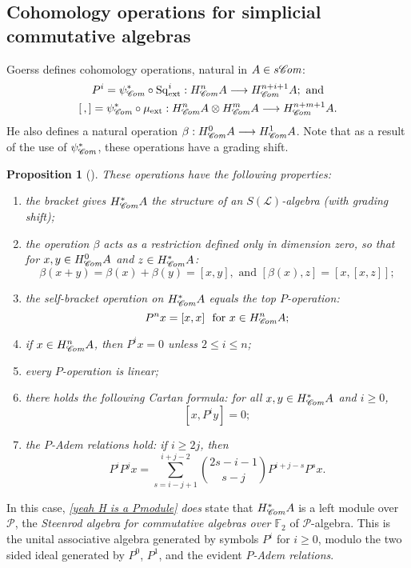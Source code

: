 \documentclass[11pt]{amsart} \renewcommand{\baselinestretch}{1.2}
\theoremstyle{plain}
\newtheorem{prop}[thm]{Proposition}
\numberwithin{equation}{section} %
\theoremstyle{plain}
\newtheorem{prop}[thm]{Proposition}
\numberwithin{equation}{chapter} %
\renewcommand{\to}{\longrightarrow}
\newcommand{\squishlist}{
}
\newcommand{\scrL}{\mathscr{L}}
\newcommand{\scrC}{\mathscr{C}}
\newcommand{\calP}{\mathcal{P}}
\newcommand{\citeBOX}[2][]{\cite[\mbox{#1}]{#2}}
\newcommand{\Palg}{{\calP}}
\newcommand{\LieOperad}{{\scrL}}
\newcommand{\ExtCohOp}{\mathrm{Sq}_\mathrm{ext}}
\newcommand{\ExtCohProd}{\mu_\mathrm{ext}}
\newcommand{\F}{\mathbb{F}}
\newcommand{\algs}{{\scrC\!\textit{\normalfont\textit{om}}}}
\newcommand{\Ftwo}{\F_2}
\newcommand{\SubsectionOrSection}[1]{\subsection{#1}}
\begin{document}
\begin{Constructing cohomology operations}
\SubsectionOrSection{Cohomology operations for simplicial commutative algebras}
\label{The example of simplicial commutative F2-algebras}
Goerss \citeBOX[\S5]{MR1089001} defines cohomology operations, natural in $A\in s \algs$:
\begin{gather*}
P^i=\psi^*_{\algs}\circ\ExtCohOp^i:H^n_{\algs}A\to H_{\algs}^{n+i+1}A;\textup{ and}\\
[\,,]=\psi^*_{\algs}\circ\ExtCohProd :H_{\algs}^nA\otimes H_{\algs}^mA\to H_{\algs}^{n+m+1}A.
\end{gather*}
He also defines a natural operation $\beta:H_{\algs}^0A\to H_{\algs}^1A$. Note that as a result of the use of $\psi^*_{\algs}$, these operations have a grading shift.
\begin{prop}[{\citeBOX[\S5]{MR1089001}}]
\label{omnibus on coh of simp algs}These operations have the following properties:
\begin{enumerate}\squishlist
\item the bracket gives $H^*_{\algs}A$ the structure of an $S(\LieOperad)$-algebra (with grading shift);
\item the operation $\beta$ acts as a restriction defined only in dimension zero, so that for $x,y\in H^0_{\algs}A$ and $z\in H^*_{\algs}A$:
\[\beta(x+y)=\beta(x)+\beta(y)=[x,y],\text{\ \ and \ }[\beta(x),z]=[x,[x,z]];\]
\item the self-bracket operation on $H^*_{\algs}A$ equals the \emph{top $P$-operation}:
\[P^nx=[x,x]\text{\ \ for $x\in H^n_{\algs}A$};\]
\item \label{P unstable vanishing} if $x\in H^n_{\algs}A$, then $P^ix=0$ unless $2\leq i\leq n$;
\item every $P$-operation is linear;
\item there holds the following \emph{Cartan formula}:  for all $x,y\in   H^*_{\algs}A$ and $i\geq0$,
\[[x,P^iy]=0;\]
\item \label{yeah H is a Pmodule}the \emph{$P$-Adem relations} hold: if $i\geq 2j$, then
\[P^iP^jx=\sum_{s=i-j+1}^{i+j-2}\binom{2s-i-1}{ s-j}P^{i+j-s}P^sx.\]
\end{enumerate}
\end{prop}
In this case, \emph{\ref{yeah H is a Pmodule}} \emph{does} state that $H^*_{\algs}A$ is a left module over $\Palg$, the \emph{Steenrod algebra for commutative algebras over $\Ftwo $} of $\Palg$-algebra. This is the unital associative algebra generated by symbols $P^i$ for $i\geq0$, modulo the two sided ideal generated by $P^0$, $P^1$, and the evident \emph{$P$-Adem relations}.



\end{Constructing cohomology operations}
\end{document}
